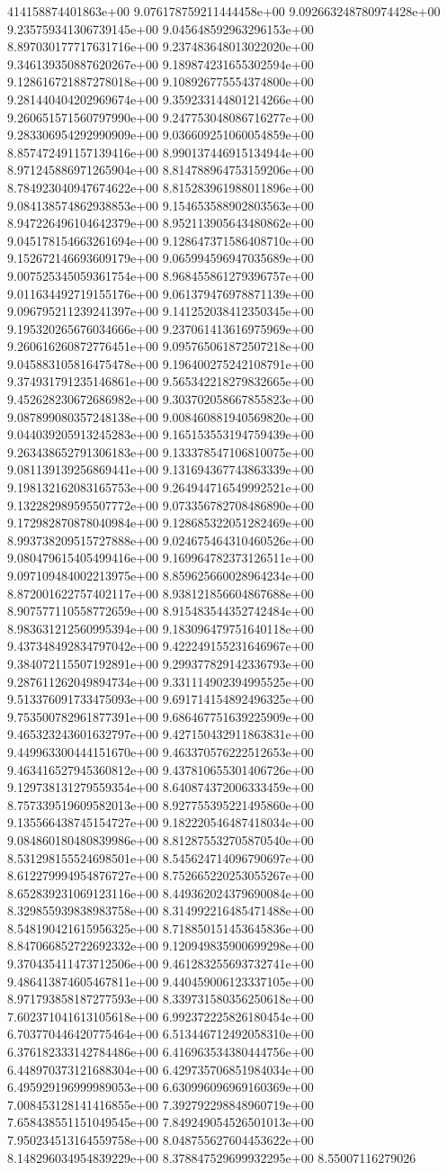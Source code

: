 414158874401863e+00	9.076178759211444458e+00	9.092663248780974428e+00	9.235759341306739145e+00	9.045648592963296153e+00	8.897030177717631716e+00	9.237483648013022020e+00	9.346139350887620267e+00	9.189874231655302594e+00	9.128616721887278018e+00	9.108926775554374800e+00	9.281440404202969674e+00	9.359233144801214266e+00	9.260651571560797990e+00	9.247753048086716277e+00	9.283306954292990909e+00	9.036609251060054859e+00	8.857472491157139416e+00	8.990137446915134944e+00	8.971245886971265904e+00	8.814788964753159206e+00	8.784923040947674622e+00	8.815283961988011896e+00	9.084138574862938853e+00	9.154653588902803563e+00	8.947226496104642379e+00	8.952113905643480862e+00	9.045178154663261694e+00	9.128647371586408710e+00	9.152672146693609179e+00	9.065994596947035689e+00	9.007525345059361754e+00	8.968455861279396757e+00	9.011634492719155176e+00	9.061379476978871139e+00	9.096795211239241397e+00	9.141252038412350345e+00	9.195320265676034666e+00	9.237061413616975969e+00	9.260616260872776451e+00	9.095765061872507218e+00	9.045883105816475478e+00	9.196400275242108791e+00	9.374931791235146861e+00	9.565342218279832665e+00	9.452628230672686982e+00	9.303702058667855823e+00	9.087899080357248138e+00	9.008460881940569820e+00	9.044039205913245283e+00	9.165153553194759439e+00	9.263438652791306183e+00	9.133378547106810075e+00	9.081139139256869441e+00	9.131694367743863339e+00	9.198132162083165753e+00	9.264944716549992521e+00	9.132282989595507772e+00	9.073356782708486890e+00	9.172982870878040984e+00	9.128685322051282469e+00	8.993738209515727888e+00	9.024675464310460526e+00	9.080479615405499416e+00	9.169964782373126511e+00	9.097109484002213975e+00	8.859625660028964234e+00	8.872001622757402117e+00	8.938121856604867688e+00	8.907577110558772659e+00	8.915483544352742484e+00	8.983631212560995394e+00	9.183096479751640118e+00	9.437348492834797042e+00	9.422249155231646967e+00	9.384072115507192891e+00	9.299377829142336793e+00	9.287611262049894734e+00	9.331114902394995525e+00	9.513376091733475093e+00	9.691714154892496325e+00	9.753500782961877391e+00	9.686467751639225909e+00	9.465323243601632797e+00	9.427150432911863831e+00	9.449963300444151670e+00	9.463370576222512653e+00	9.463416527945360812e+00	9.437810655301406726e+00	9.129738131279559354e+00	8.640874372006333459e+00	8.757339519609582013e+00	8.927755395221495860e+00	9.135566438745154727e+00	9.182220546487418034e+00	9.084860180480839986e+00	8.812875532705870540e+00	8.531298155524698501e+00	8.545624714096790697e+00	8.612279994954876727e+00	8.752665220253055267e+00	8.652839231069123116e+00	8.449362024379690084e+00	8.329855939838983758e+00	8.314992216485471488e+00	8.548190421615956325e+00	8.718850151453645836e+00	8.847066852722692332e+00	9.120949835900699298e+00	9.370435411473712506e+00	9.461283255693732741e+00	9.486413874605467811e+00	9.440459006123337105e+00	8.971793858187277593e+00	8.339731580356250618e+00	7.602371041613105618e+00	6.992372225826180454e+00	6.703770446420775464e+00	6.513446712492058310e+00	6.376182333142784486e+00	6.416963534380444756e+00	6.448970373121688304e+00	6.429735706851984034e+00	6.495929196999989053e+00	6.630996096969160369e+00	7.008453128141416855e+00	7.392792298848960719e+00	7.658438551151049545e+00	7.849249054526501013e+00	7.950234513164559758e+00	8.048755627604453622e+00	8.148296034954839229e+00	8.378847529699932295e+00	8.55007116279026
